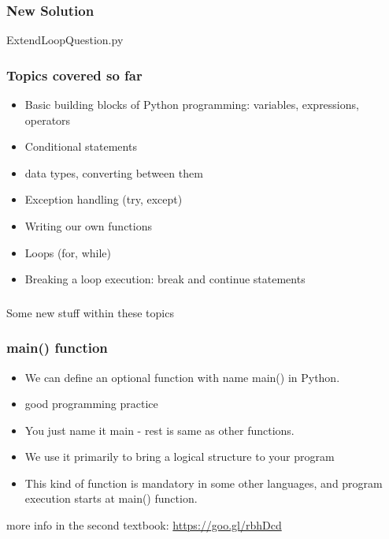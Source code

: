 \documentclass{beamer}
\begin{document}
\begin{frame}
\frametitle{New Solution}
ExtendLoopQuestion.py
\end{frame}

\begin{frame}
\frametitle{Topics covered so far}
\begin{itemize}
\item Basic building blocks of Python programming: variables, expressions, operators
\item Conditional statements
\item data types, converting between them
\item Exception handling (try, except)
\item Writing our own functions
\item Loops (for, while)
\item Breaking a loop execution: break and continue statements
\end{itemize}
\end{frame}

\begin{frame}
\frametitle{}
\centering Some new stuff within these topics
\end{frame}

\begin{frame}
\frametitle{main() function}
\begin{itemize}
\item We can define an optional function with name main() in Python.  
\item good programming practice
\item You just name it main - rest is same as other functions. 
\item We use it primarily to bring a logical structure to your program
\item This kind of function is mandatory in some other languages, and program execution starts at main() function.
\end{itemize}
more info in the second textbook: \url{https://goo.gl/rbhDcd}
\end{frame}
\end{document}
